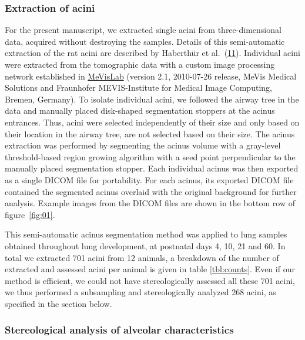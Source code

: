 \documentclass[
  american,
]{article}
\begin{document}
\hypertarget{extraction-of-acini}{%
\subsubsection{Extraction of acini}\label{extraction-of-acini}}

For the present manuscript, we extracted single acini from three-dimensional data, acquired without destroying the samples.
Details of this semi-automatic extraction of the rat acini are described by Haberthür et al.~(\protect\hyperlink{ref-7YLeeyu}{11}).
Individual acini were extracted from the tomographic data with a custom image processing network established in \href{https://www.mevislab.de/}{MeVisLab} (version 2.1, 2010-07-26 release, MeVis Medical Solutions and Fraunhofer MEVIS-Institute for Medical Image Computing, Bremen, Germany).
To isolate individual acini, we followed the airway tree in the data and manually placed disk-shaped segmentation stoppers at the acinus entrances.
Thus, acini were selected independently of their size and only based on their location in the airway tree, are not selected based on their size.
The acinus extraction was performed by segmenting the acinus volume with a gray-level threshold-based region growing algorithm with a seed point perpendicular to the manually placed segmentation stopper.
Each individual acinus was then exported as a single DICOM file for portability.
For each acinus, its exported DICOM file contained the segmented acinus overlaid with the original background for further analysis.
Example images from the DICOM files are shown in the bottom row of figure~\ref{fig:01}.

This semi-automatic acinus segmentation method was applied to lung samples obtained throughout lung development, at postnatal days 4, 10, 21 and 60.
In total we extracted 701 acini from 12 animals, a breakdown of the number of extracted and assessed acini per animal is given in table \ref{tbl:counts}.
Even if our method is efficient, we could not have stereologically assessed all these 701 acini, we thus performed a subsampling and stereologically analyzed 268 acini, as specified in the section below.

\hypertarget{stereological-analysis-of-alveolar-characteristics}{%
\subsubsection{Stereological analysis of alveolar characteristics}\label{stereological-analysis-of-alveolar-characteristics}}
\end{document}
